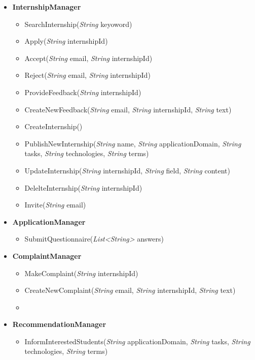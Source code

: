 \begin{itemize}
    \item \textbf{\textbf{InternshipManager}}
\begin{itemize}



    \item SearchInternship(\textit{String} keyoword)
    \item Apply(\textit{String} internshipId)
    \item Accept(\textit{String} email, \textit{String} internshipId)
    \item Reject(\textit{String} email, \textit{String} internshipId)
    \item ProvideFeedback(\textit{String} internshipId)
    \item CreateNewFeedback(\textit{String} email, \textit{String} internshipId, \textit{String} text)
    \item CreateInternship()
    \item PublishNewInternship(\textit{String} name, \textit{String} applicationDomain, \textit{String} tasks, \textit{String} technologies, \textit{String}  terms)
    \item UpdateInternship(\textit{String} internshipId, \textit{String} field, \textit{String} content)
    \item DelelteInternship(\textit{String} internshipId)
    \item Invite(\textit{String} email)
\end{itemize}

    \item \textbf{\textbf{ApplicationManager}}
\begin{itemize}
        \item SubmitQuestionnaire(\textit{List<String>} answers)
\end{itemize}

    \item \textbf{\textbf{ComplaintManager}}
\begin{itemize}
        \item MakeComplaint(\textit{String} internshipId)
        \item CreateNewComplaint(\textit{String} email, \textit{String} internshipId, \textit{String} text)
        \item 
\end{itemize}

    \item \textbf{\textbf{RecommendationManager}}
\begin{itemize}
        \item InformInterestedStudents(\textit{String} applicationDomain, \textit{String} tasks, \textit{String} technologies, \textit{String}  terms)
\end{itemize}

\end{itemize}

